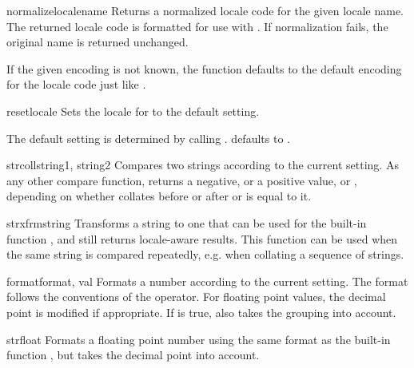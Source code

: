 \begin{funcdesc}{normalize}{localename}
  Returns a normalized locale code for the given locale name.  The
  returned locale code is formatted for use with
  .  If normalization fails, the original name
  is returned unchanged.

  If the given encoding is not known, the function defaults to
  the default encoding for the locale code just like
  .
\end{funcdesc}

\begin{funcdesc}{resetlocale}{}
  Sets the locale for  to the default setting.

  The default setting is determined by calling
  .   defaults to
  .
\end{funcdesc}

\begin{funcdesc}{strcoll}{string1, string2}
  Compares two strings according to the current
   setting. As any other compare function,
  returns a negative, or a positive value, or , depending on
  whether  collates before or after  or is
  equal to it.
\end{funcdesc}

\begin{funcdesc}{strxfrm}{string}
  Transforms a string to one that can be used for the built-in
  function , and still returns
  locale-aware results.  This function can be used when the same
  string is compared repeatedly, e.g. when collating a sequence of
  strings.
\end{funcdesc}

\begin{funcdesc}{format}{format, val}
  Formats a number  according to the current
   setting.  The format follows the conventions
  of the \code{\%} operator.  For floating point values, the decimal
  point is modified if appropriate.  If  is true, also
  takes the grouping into account.
\end{funcdesc}

\begin{funcdesc}{str}{float}
  Formats a floating point number using the same format as the
  built-in function , but takes the decimal
  point into account.
\end{funcdesc}

